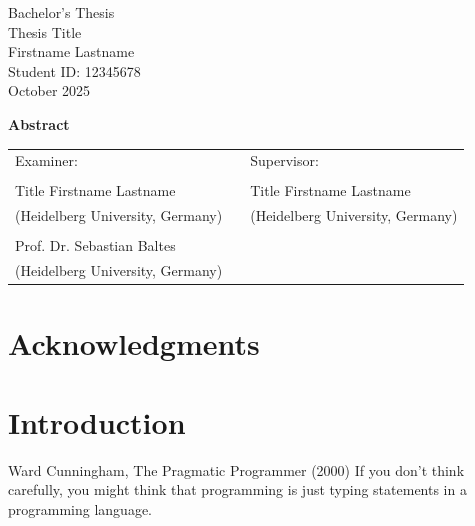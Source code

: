\documentclass[
    pdftex,
    final,
    11pt,
    a4paper,
    parskip=false, %
    twoside, %
    footheight=0mm, %
    footinclude=false,
    toc=bibliography, %
    toc=listof %
]{scrbook} %
\newcommand{\thesistype}{Bachelor's Thesis} %
\newcommand{\thesistitle}{Thesis Title}
\newcommand{\studentname}{Firstname Lastname}
\newcommand{\monthyear}{October 2025}
\newcommand{\studentid}{12345678}
\newcommand{\examiner}{Title Firstname Lastname}
\newcommand{\secondexaminer}{Prof. Dr. Sebastian Baltes}
\newcommand{\supervisor}{Title Firstname Lastname} %
\newcommand{\ubt}{Heidelberg University, Germany}
\begin{document}
\vspace{1pt}
	
\begin{center}
	\thesistype \\
	\vspace{11pt}
	{\Large\sffamily\thesistitle}\\
	\vspace{15pt}
	\studentname \\
	{\scriptsize Student ID: \studentid}\\
	\vspace{15pt}
	\monthyear \\
\end{center}

\vspace{10pt}
	
\begin{center}
	{\large\sffamily\textbf{{Abstract}}}\\
\end{center}
\noindent \lipsum[1-2]

\vfill
	
\noindent
\begin{tabularx}{\textwidth}{l X l}
   Examiner:     & & Supervisor: \\
   \\
   \examiner         & & \supervisor \\
   {\scriptsize (\ubt)} & & {\scriptsize (\ubt)} \\
   \\
   \secondexaminer && \\
   {\scriptsize (\ubt)} & & 
\end{tabularx}

\newpage

\chapter*{Acknowledgments}

\lipsum[1-4]

\tableofcontents

\clearpage

\mainmatter %

\chapter{Introduction}
\label{ch:introduction}

\begin{chapter-quotation}{Ward Cunningham, The Pragmatic Programmer (2000)}
If you don't think carefully, you might think that programming is just typing statements in a programming language.
\end{chapter-quotation} 
\end{document}
